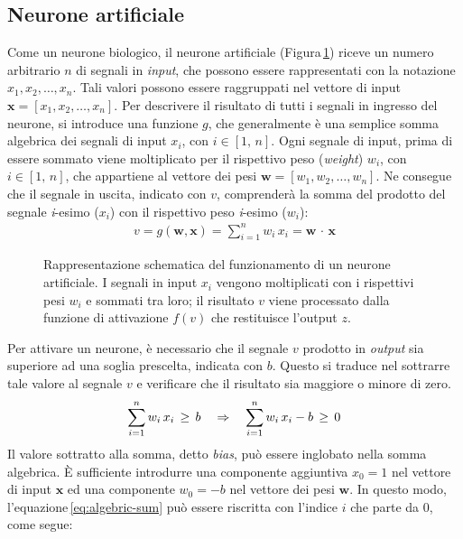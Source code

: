 \subsection{Neurone artificiale}
% 
Come un neurone biologico, il neurone artificiale (Figura\,\ref{fig:artificial-neuron}) riceve un numero arbitrario $n$ di segnali in \textsl{input}, che possono essere rappresentati con la notazione $x_1, x_2, \dots, x_n$. Tali valori possono essere raggruppati nel vettore di input $\mathbf{x} = \left[x_1, x_2, \dots, x_n\right]$. Per descrivere il risultato di tutti i segnali in ingresso del neurone, si introduce una funzione $g$, che generalmente è una semplice somma algebrica dei segnali di input $x_i$, con $i\in[1,\,n]$. Ogni segnale di input, prima di essere sommato viene moltiplicato per il rispettivo peso (\textit{weight}) $w_i$, con $i\in[1,\,n]$, che appartiene al vettore dei pesi $\mathbf{w} = \left[w_1, w_2, \dots, w_n \right]$. Ne consegue che il segnale in uscita, indicato con $v$, comprenderà la somma del prodotto del segnale \textit{i}-esimo ($x_i$) con il rispettivo peso \textit{i}-esimo ($w_i$):
% 
\begin{gather}
    v = g\left(\mathbf{w}, \mathbf{x}\right) = \sum_{i = 1}^n w_i\,x_i = \mathbf{w}\,\cdot\,\mathbf{x}
    \label{eq:algebric-sum}
\end{gather}
% 
\begin{figure}[!b]
    \centering
    
    \caption[Rappresentazione schematica del funzionamento di un neurone artificiale.]{Rappresentazione schematica del funzionamento di un neurone artificiale. I segnali in input $x_i$ vengono moltiplicati con i rispettivi pesi $w_i$ e sommati tra loro; il risultato $v$ viene processato dalla funzione di attivazione $f(v)$ che restituisce l'output $z$.}\label{fig:artificial-neuron}
\end{figure}
% 
\noindent Per attivare un neurone, è necessario che il segnale $v$ prodotto in \textsl{output} sia superiore ad una soglia prescelta, indicata con $b$. Questo si traduce nel sottrarre tale valore al segnale $v$ e verificare che il risultato sia maggiore o minore di zero.
% 
\begin{gather*}
    \sum_{i = 1}^n w_i\,x_i \,\geq\, b
    \hspace{10px} \Rightarrow \hspace{10px}
    \sum_{i = 1}^n w_i\,x_i - b \,\geq\, 0
\end{gather*}
% 
\noindent Il valore sottratto alla somma, detto \textit{bias}, può essere inglobato nella somma algebrica. È sufficiente introdurre una componente aggiuntiva $x_0 = 1$ nel vettore di input $\mathbf{x}$ ed una componente $w_0 = -b$ nel vettore dei pesi $\mathbf{w}$. In questo modo, l'equazione\,\ref{eq:algebric-sum} può essere riscritta con l'indice $i$ che parte da 0, come segue:

